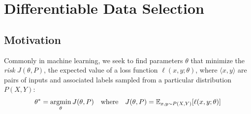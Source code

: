 \section{\label{sec:method}Differentiable Data Selection}
\subsection{\label{sec:dds_motivation}Motivation}


Commonly in machine learning, we seek to find parameters $\theta$ that minimize the \emph{risk} $J(\theta,P)$, the expected value of a loss function $\ell(x, y; \theta)$,
where $\langle x, y \rangle$ are pairs of inputs and associated labels sampled from a particular distribution $P(X, Y)$:
\begin{equation}
  \label{eqn:generic_optim}
  \begin{aligned}
    \theta^* = \operatorname*{argmin}_\theta J(\theta, P)
    ~~~\text{where}~~~
    J(\theta, P) = \mathbb{E}_{x, y \sim P(X, Y)} [\ell(x, y; \theta)]
  \end{aligned}
\end{equation}

